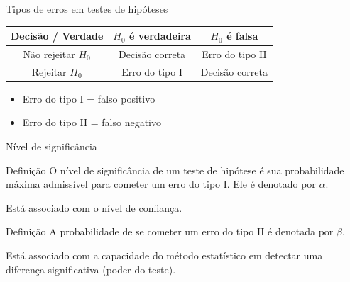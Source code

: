 \documentclass{beamer}
\begin{document}
\begin{frame}{\scriptsize Tipos de erros em testes de hipóteses}
  \begin{block}{}
    \footnotesize
    \begin{tabular}{c||c|c}
      Decisão / Verdade & $H_0$ é verdadeira & $H_0$ é falsa \\
      \hline
      \hline
      Não rejeitar $H_0$ & Decisão correta & Erro do tipo II\\
      \hline
      Rejeitar $H_0$ & Erro do tipo I & Decisão correta\\
    \end{tabular}
  \end{block}
  \begin{itemize}
  \item Erro do tipo I = falso positivo
  \item Erro do tipo II = falso negativo
  \end{itemize}
\end{frame}

\begin{frame}{\scriptsize Nível de significância}
  \begin{block}{Definição}
    \scriptsize
    O \alert{nível de significância} de um teste de hipótese é sua
    probabilidade máxima admissível para cometer um erro do tipo
    I. Ele é denotado por $\alpha$.

    \bigskip
    Está associado com o nível de confiança.
  \end{block}
  \begin{block}{Definição}
    \scriptsize
    A probabilidade de se cometer um erro do tipo II é denotada por
    $\beta$.

    \bigskip Está associado com a capacidade do método estatístico em detectar uma diferença significativa (poder do teste).
  \end{block}
\end{frame}
\end{document}
